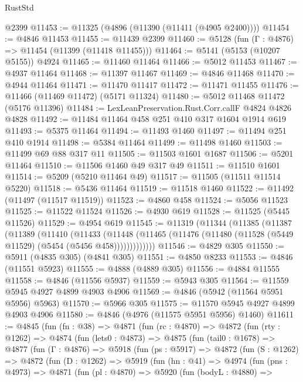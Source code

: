 \begin{lexlean}{RustStd}
\begin{coremodule}
    @2399
@11453 := @11325 (@4896 (@11390 (@11411 (@4905 @2400))))
@11454 := @4846 @11453
@11455 := @11439 @2399
@11460 := @5128 (fun (Γ : @4876) => @11454 (@11399 (@11418 @11455)))
@11464 := @5141 (@5153 (@10207 @5155)) @4924
@11465 := @11460 @11464
@11466 := @5012 @11453
@11467 := @4937 @11464
@11468 := @11397 @11467
@11469 := @4846 @11468
@11470 := @4944 @11464
@11471 := @11470 @11417
@11472 := @11471 @11455
@11476 := @11466 (@11469 @11472) (@5171 @11324)
@11480 := @5012 @11468 @11472 (@5176 @11396)
@11484 := LexLeanPreservation.Rust.Corr.callF @4824 @4826 @4828
@11492 := @11484 @11464 @458 @251 @410 @317 @1604 @1914 @619
@11493 := @5375 @11464
@11494 := @11493 @1460
@11497 := @11494 @251 @410 @1914
@11498 := @5384 @11464
@11499 := @11498 @1460
@11503 := @11499 @69 @88 @317 @11
@11505 := @11503 @1601 @1687
@11506 := @5201 @11464
@11510 := @11506 @1460 @49 @317 @49
@11511 := @11510 @1601
@11514 := @5209 (@5210 @11464 @49)
@11517 := @11505 (@11511 @11514 @5220)
@11518 := @5436 @11464
@11519 := @11518 @1460
@11522 := @11492 (@11497 (@11517 @11519))
@11523 := @4860 @458
@11524 := @5056 @11523
@11525 := @11522 @11524
@11526 := @4930 @619
@11528 := @11525 (@5445 @11526)
@11529 := @4954 @619
@11545 := @11319
    (@11344
      (@11385
        (@11387
          (@11389
            (@11410
              (@11433
                (@11448
                  (@11465 (@11476 (@11480 (@11528 (@5449 @11529) (@5454 (@5456 @458)))))))))))))
@11546 := @4829 @305
@11550 := @5911 (@4835 @305) (@4841 @305)
@11551 := @4850 @8233
@11553 := @4846 (@11551 @5923)
@11555 := @4888 (@4889 @305)
@11556 := @4884 @11555
@11558 := @4846 (@11556 @5937)
@11559 := @5943 @305
@11564 := @11559 @5945 @4927 @4899 @4903 @4906
@11569 := @4846 (@5942 (@11564 @5951 @5956) @5963)
@11570 := @5966 @305
@11575 := @11570 @5945 @4927 @4899 @4903 @4906
@11580 := @4846 (@4976 (@11575 @5951 @5956) @1460)
@11611 := @4845
    (fun (fn : @38) =>
    @4871
      (fun (rc : @4870) =>
      @4872
        (fun (rty : @1262) =>
        @4874
          (fun (lets0 : @4873) =>
          @4875
            (fun (tail0 : @1678) =>
            @4877
              (fun (Γ : @4876) =>
              @5918
                (fun (ps : @5917) =>
                @4872
                  (fun (S : @1262) =>
                  @4872
                    (fun (D : @1262) =>
                    @5919
                      (fun (hn : @41) =>
                      @4974
                        (fun (pns : @4973) =>
                        @4871
                          (fun (pl : @4870) =>
                          @5920
                            (fun (bodyL : @4880) =>

\end{coremodule}
\end{lexlean}
